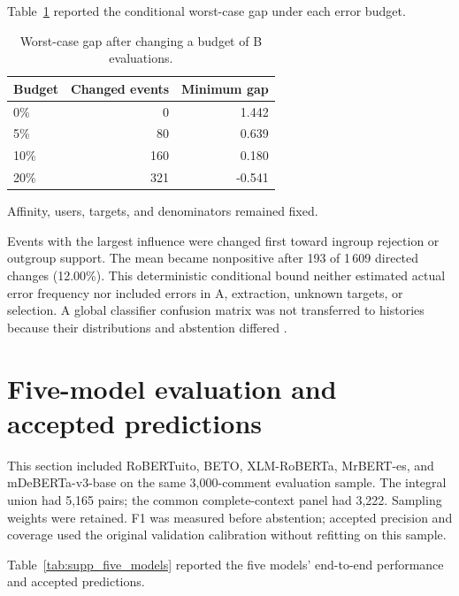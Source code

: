 \documentclass[11pt,a4paper]{article}
\begin{document}
Table~\ref{tab:supp_adverse} reported the conditional worst-case gap under each error budget.

\begin{table}[H]\centering\small
\caption{Worst-case gap after changing a budget of B evaluations.}
\label{tab:supp_adverse}
\setlength{\tabcolsep}{4pt}
\begin{tabular}{lrr}\toprule
Budget & Changed events & Minimum gap\\\midrule
0\% & 0 & 1.442\\
5\% & 80 & 0.639\\
10\% & 160 & 0.180\\
20\% & 321 & -0.541\\
\bottomrule\end{tabular}
\par\smallskip\footnotesize Affinity, users, targets, and denominators remained fixed.
\end{table}

Events with the largest influence were changed first toward ingroup rejection or outgroup support. The mean became nonpositive after 193 of 1\,609 directed changes (12.00\%). This deterministic conditional bound neither estimated actual error frequency nor included errors in A, extraction, unknown targets, or selection. A global classifier confusion matrix was not transferred to histories because their distributions and abstention differed \cite{Egami2023Surrogates}.

\section{Five-model evaluation and accepted predictions}

This section included RoBERTuito, BETO, XLM-RoBERTa, MrBERT-es, and mDeBERTa-v3-base on the same 3,000-comment evaluation sample. The integral union had 5,165 pairs; the common complete-context panel had 3,222. Sampling weights were retained. F1 was measured before abstention; accepted precision and coverage used the original validation calibration without refitting on this sample.

Table~\ref{tab:supp_five_models} reported the five models' end-to-end performance and accepted predictions.
\end{document}
